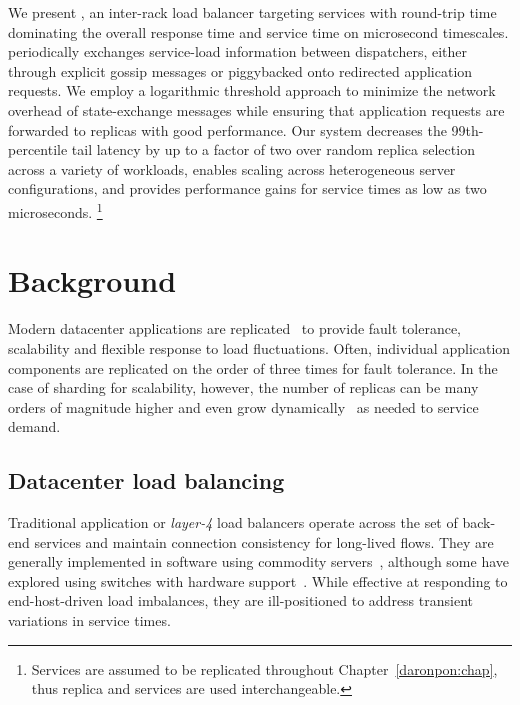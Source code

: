 We present \daronpon, an inter-rack load balancer targeting
services with round-trip time dominating the overall response time 
and service time on microsecond timescales.
%
\daronpon periodically exchanges service-load information between dispatchers,
either through explicit gossip messages or piggybacked onto redirected application
requests.  We employ a logarithmic threshold approach to minimize
the network overhead of state-exchange messages while ensuring that
application requests are forwarded to replicas with good performance.
Our system decreases the 99th-percentile tail latency by up to a
factor of two over random replica selection across a variety of
workloads, enables scaling across heterogeneous server
configurations, and provides performance gains for service times as
low as two microseconds.
%
\footnote{
Services are assumed to be replicated throughout Chapter~\ref{daronpon:chap}, thus
replica and services are used interchangeable.}


\section{Background}
\label{daronpon:sec:background}


Modern datacenter applications are
replicated~\cite{rocksdb,memcached,mongodb} to provide fault
tolerance, scalability and flexible response to load
fluctuations. Often, individual application components are replicated
on the order of three times for fault tolerance. In the case of
sharding for scalability, however, the number of replicas can be many
orders of magnitude higher and even grow
dynamically~\cite{facebook_shard,google_slicer,microsoft_service_fabric}
as needed to service demand.

\subsection{Datacenter load balancing}
Traditional application or \textit{layer-4} load balancers operate across
the set of back-end services and maintain connection consistency for
long-lived flows. They are generally implemented in software using
commodity servers~\cite{cheetah, maglev, beamer, ananta}, although
some have explored using switches with hardware support~\cite{duet,
  silkroad}.  While effective at responding to end-host-driven load
imbalances, they are ill-positioned to address transient
variations in service times.

